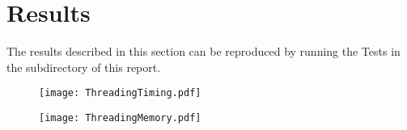 \documentclass{InsightArticle}
\begin{document}
\appendix

\section{Results}

The results described in this section can be reproduced by running the Tests in
the  subdirectory of this report.

\begin{figure}[ht]
\centering
\texttt{[image: ThreadingTiming.pdf]}
\end{figure}

\begin{figure}[ht]
\centering
\texttt{[image: ThreadingMemory.pdf]}
\end{figure}


\end{document}
